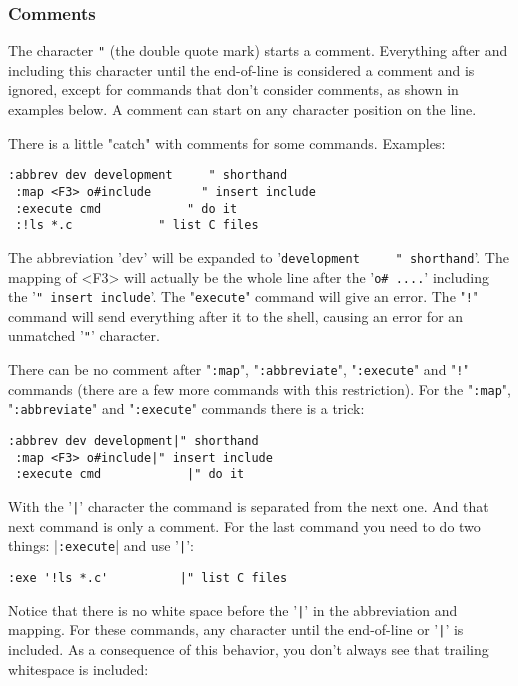 \subsubsection{Comments}
The character \verb!"! (the double quote mark) starts a comment.
Everything after and including this character until the end-of-line is considered a comment and is ignored, except for commands that don't consider comments, as shown in examples below.
A comment can start on any character position on the line.

There is a little "catch" with comments for some commands.
Examples:

\begin{Verbatim}[samepage=true]
 :abbrev dev development     " shorthand
 :map <F3> o#include       " insert include
 :execute cmd            " do it
 :!ls *.c            " list C files
\end{Verbatim}

The abbreviation 'dev' will be expanded to '\verb!development     " shorthand!'.
The mapping of <F3> will actually be the whole line after the '\verb!o# ....!' including the '\verb!" insert include!'.
The "\verb!execute!" command will give an error.
The "\verb:!:" command will send everything after it to the shell, causing an error for an unmatched '\verb!"!' character.

There can be no comment after "\verb!:map!", "\verb!:abbreviate!", "\verb!:execute!" and "\verb:!:" commands (there are a few more commands with this restriction).
For the "\verb!:map!", "\verb!:abbreviate!" and "\verb!:execute!" commands there is a trick:

\begin{Verbatim}[samepage=true]
 :abbrev dev development|" shorthand
 :map <F3> o#include|" insert include
 :execute cmd            |" do it
\end{Verbatim}

With the '\verb!|!' character the command is separated from the next one.
And that next command is only a comment.
For the last command you need to do two things: |\verb!:execute!| and use '\verb!|!':

\begin{Verbatim}[samepage=true]
 :exe '!ls *.c'          |" list C files
\end{Verbatim}

Notice that there is no white space before the '\verb!|!' in the abbreviation and mapping.
For these commands, any character until the end-of-line or '\verb!|!' is included.
As a consequence of this behavior, you don't always see that trailing whitespace is included:


